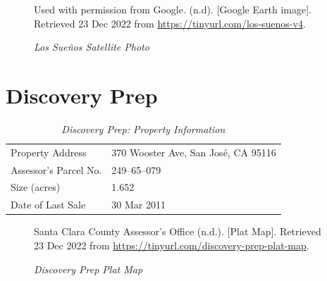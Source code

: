\begin{figure}[hbtp]
  \caption[Los Sueños Satellite Photo]{\textit{Los Sueños Satellite Photo}}
  \label{fig:los-sueños-sat-photo}
  {Used with permission from Google. (n.d). [Google Earth image]. Retrieved 23 Dec 2022 from \url{https://tinyurl.com/los-suenos-v4}.}
\end{figure}


\clearpage
\section{Discovery Prep}\label{sec:discover-prep-info}\indent

\begin{table}[htbp]
  \SingleSpacing%
  \caption[Discovery Prep: Property Information]{\textit{Discovery Prep: Property Information}}%
  \label{tab:discovery-prep-prop-info}
  \begin{tabular}{ll}
    \toprule
    Property Address      & 370 Wooster Ave, San José, CA 95116 \\
    Assessor's Parcel No. &  249–65–079 \\
    Size (acres)          & 1.652 \\
    Date of Last Sale     & 30 Mar 2011\\
    \bottomrule
  \end{tabular}
\end{table}

\begin{figure}[hbtp]
  \caption[Discovery Prep Plat Map]{\textit{Discovery Prep Plat Map}}%
  \label{fig:discovery-prep-plat-map}
  {Santa Clara County Assessor's Office (n.d.). [Plat Map]. Retrieved 23 Dec 2022 from  \url{https://tinyurl.com/discovery-prep-plat-map}.}
\end{figure}

